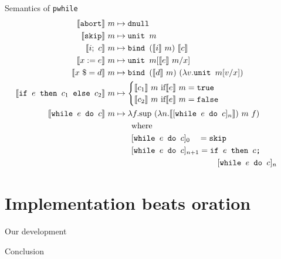 \documentclass{beamer}
\begin{document}

\begin{frame}{Semantics of \texttt{pwhile}}
  \begin{align*}
    \llbracket \texttt{abort} \rrbracket~m
    &\mapsto \texttt{dnull}\\
    \llbracket \texttt{skip} \rrbracket~m
    &\mapsto \texttt{unit }m\\
    \llbracket i;~c \rrbracket~m
    &\mapsto \texttt{bind }(\llbracket i \rrbracket~m) ~
      \llbracket c \rrbracket \\
    \llbracket x := e \rrbracket~m
    &\mapsto \texttt{unit }m [\llbracket e \rrbracket~m / x]\\
    \llbracket x~\$= d \rrbracket~m
    &\mapsto \texttt{bind } (\llbracket d \rrbracket~m) ~(\lambda v.\texttt{unit }m[v/x])
    \\ 
    \hspace{-1.5em}\llbracket \texttt{if $e$ then $c_1$ else $c_2$} \rrbracket~m
    &\mapsto \begin{cases} \llbracket c_1 \rrbracket~m\text{ if} \llbracket e
           \rrbracket~m = \texttt{true}\\ 
           \llbracket c_2 \rrbracket~m\text{ if} \llbracket e \rrbracket~m =
           \texttt{false}\\ 
         \end{cases}\\
    \llbracket \texttt{while $e$ do $c$} \rrbracket~m
    &\mapsto \lambda f.\text{sup}~(\lambda n. \llbracket [\texttt{while $e$ do }c]_n
      \rrbracket)~ m~f)\\
    & ~~~~~~ \text{where}\\
    & ~~~~~~ [\texttt{while $e$ do }c]_0 ~~~ = \texttt{skip}\\
    & ~~~~~~ [\texttt{while $e$ do }c]_{n+1} = \texttt{if $e$ then $c$;} \\
    & \hspace{125pt}[\texttt{while $e$ do }c]_n
  \end{align*}
\end{frame}


\section{Implementation beats oration}


\begin{frame}{Our development}

\end{frame}


\begin{frame}{Conclusion}

\end{frame}




\end{document}
